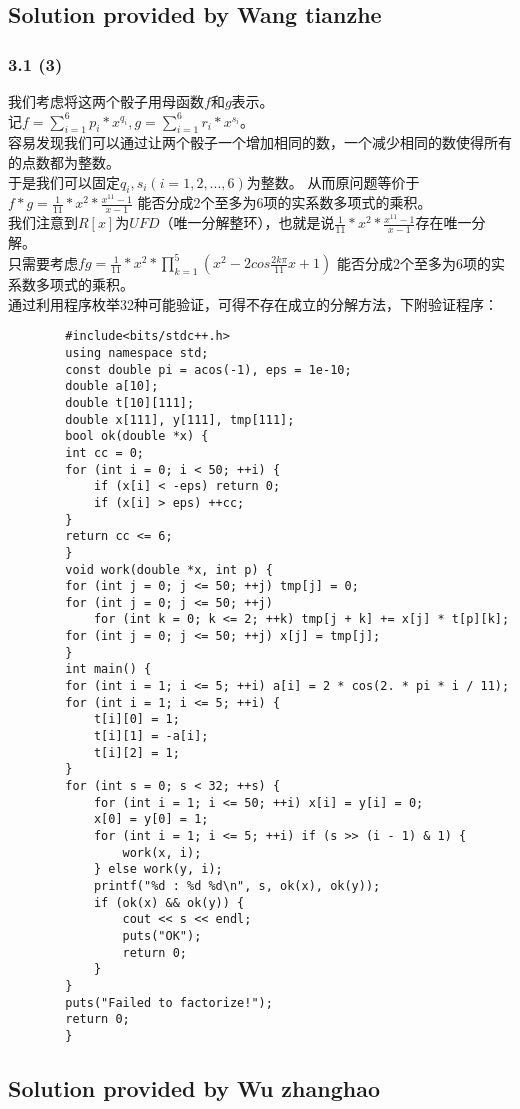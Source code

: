 \begin{appendix}
	\subsection{Solution provided by Wang tianzhe}
		\subsubsection{3.1 (3)}
		我们考虑将这两个骰子用母函数$f$和$g$表示。\\
		\indent
		记$f = \sum_{i=1}^6 p_{i}*x^{q_i}, g = \sum_{i=1}^6 r_{i}*x^{s_i}$。
		\\ \indent 容易发现我们可以通过让两个骰子一个增加相同的数，一个减少相同的数使得所有的点数都为整数。\\
		\indent 于是我们可以固定$q_i,s_i(i=1,2,...,6)$为整数。
		从而原问题等价于$f*g=\frac{1}{11} * x^2 * \frac{x^{11} - 1}{x-1} $
		能否分成2个至多为6项的实系数多项式的乘积。\\
		\indent 我们注意到$R[x]$为$UFD$（唯一分解整环），也就是说$\frac{1}{11} * x^2 * \frac{x^{11} - 1}{x-1}$存在唯一分解。\\
		只需要考虑$fg = \frac{1}{11} * x^2 * \prod_{k=1}^5(x^2-2cos\frac{2k\pi}{11} x+1)$
		能否分成2个至多为6项的实系数多项式的乘积。\\
		\indent 通过利用程序枚举32种可能验证，可得不存在成立的分解方法，下附验证程序：
		\begin{lstlisting}
		#include<bits/stdc++.h>
		using namespace std;
		const double pi = acos(-1), eps = 1e-10;
		double a[10];
		double t[10][111];
		double x[111], y[111], tmp[111];
		bool ok(double *x) {
		int cc = 0;
		for (int i = 0; i < 50; ++i) {
			if (x[i] < -eps) return 0;
			if (x[i] > eps) ++cc;
		}
		return cc <= 6;
		}
		void work(double *x, int p) {
		for (int j = 0; j <= 50; ++j) tmp[j] = 0;
		for (int j = 0; j <= 50; ++j)
			for (int k = 0; k <= 2; ++k) tmp[j + k] += x[j] * t[p][k];
		for (int j = 0; j <= 50; ++j) x[j] = tmp[j];
		}
		int main() {
		for (int i = 1; i <= 5; ++i) a[i] = 2 * cos(2. * pi * i / 11);
		for (int i = 1; i <= 5; ++i) {
			t[i][0] = 1;
			t[i][1] = -a[i];
			t[i][2] = 1;
		}
		for (int s = 0; s < 32; ++s) {
			for (int i = 1; i <= 50; ++i) x[i] = y[i] = 0;
			x[0] = y[0] = 1;
			for (int i = 1; i <= 5; ++i) if (s >> (i - 1) & 1) {
				work(x, i);
			} else work(y, i);
			printf("%d : %d %d\n", s, ok(x), ok(y));
			if (ok(x) && ok(y)) {
				cout << s << endl;
				puts("OK");
				return 0;
			}
		}
		puts("Failed to factorize!");
		return 0;
		}
		\end{lstlisting}
	\subsection{Solution provided by Wu zhanghao}

\end{appendix}

